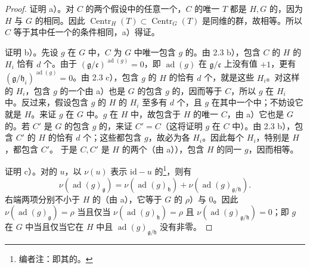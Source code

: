 \begin{proof}
证明 a）。对 $C$ 的两个假设中的任意一个，$C$ 的唯一 $T$ 都是 $H,G$ 的，因为 $H$ 与 $G$ 的相同。因此 $\operatorname{Centr}_H(T)\subset\operatorname{Centr}_G(T)$ 是同维的群，故相等。所以 $C$ 等于其中任一个的条件相同，a）得证。

证明 b）。先设 $g$ 在 $G$ 中，$C$ 为 $G$ 中唯一包含 $g$ 的。由 2.3 b），包含 $C$ 的 $H$ 的 $H_i$ 恰有 $d$ 个。由于 $(\mathfrak g/\mathfrak c)^{\operatorname{ad}(g)}=0$，即 $\operatorname{ad}(g)$ 在 $\mathfrak g/\mathfrak c$ 上没有值 $+1$，更有 $(\mathfrak g/\mathfrak h_i)^{\operatorname{ad}(g)}=0$。由 2.3 c），包含 $g$ 的 $H$ 的恰有 $d$ 个，就是这些 $H_i$。对这样的 $H_i$，包含 $g$ 的一个由 a）也是 $G$ 的包含 $g$ 的，因而等于 $C$，所以 $g$ 在 $H_i$ 中。反过来，假设包含 $g$ 的 $H$ 的 $H_i$ 至多有 $d$ 个，且 $g$ 在其中一个中；不妨设它就是 $H$。来证 $g$ 在 $G$ 中。$g$ 在 $H$ 中，故包含于 $H$ 的唯一 $C$，由 a）它也是 $G$ 的。若 $C'$ 是 $G$ 的包含 $g$ 的，来证 $C'=C$（这将证明 $g$ 在 $C$ 中）。由 2.3 b），包含 $C'$ 的 $H$ 的恰有 $d$ 个；这些都包含 $g$，故必为各 $H_i$。因此每个 $H_i$，特别是 $H$，都包含 $C'$。
于是 $C,C'$ 是 $H$ 的两个（由 a）），包含 $H$ 的同一 $g$，因而相等。

证明 c）。对的 $u$，以 $\nu(u)$ 表示 $\mathrm{id}-u$ 的\footnote{编者注：即其的。}，则有
\[\nu(\operatorname{ad}(g)_{\mathfrak g})=\nu(\operatorname{ad}(g)_{\mathfrak h})+\nu(\operatorname{ad}(g)_{\mathfrak g/\mathfrak h}).\]
右端两项分别不小于 $H$ 的（由 a），它等于 $G$ 的 $\rho$）与 $0$。因此 $\nu(\operatorname{ad}(g)_{\mathfrak g})=\rho$ 当且仅当 $\nu(\operatorname{ad}(g)_{\mathfrak h})=\rho$ 且 $\nu(\operatorname{ad}(g)_{\mathfrak g/\mathfrak h})=0$；即 $g$ 在 $G$ 中当且仅当它在 $H$ 中且 $\operatorname{ad}(g)_{\mathfrak g/\mathfrak h}$ 没有非零。
\end{proof}
